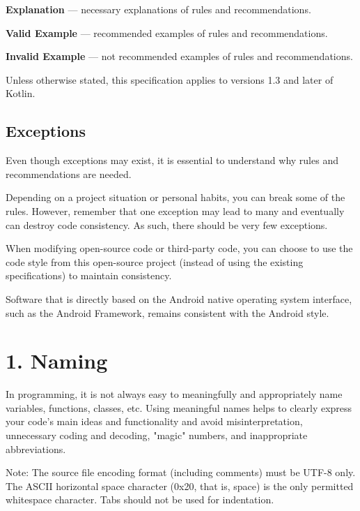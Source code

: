 \textbf{Explanation} — necessary explanations of rules and recommendations.



\textbf{Valid Example} — recommended examples of rules and recommendations.



\textbf{Invalid Example} — not recommended examples of rules and recommendations.



Unless otherwise stated, this specification applies to versions 1.3 and later of Kotlin.



\subsection*{\textbf{Exceptions}}



Even though exceptions may exist, it is essential to understand why rules and recommendations are needed.

Depending on a project situation or personal habits, you can break some of the rules. However, remember that one exception may lead to many and eventually can destroy code consistency. As such, there should be very few exceptions.

When modifying open-source code or third-party code, you can choose to use the code style from this open-source project (instead of using the existing specifications) to maintain consistency.

Software that is directly based on the Android native operating system interface, such as the Android Framework, remains consistent with the Android style.

\section*{\textbf{1. Naming}}

In programming, it is not always easy to meaningfully and appropriately name variables, functions, classes, etc. Using meaningful names helps to clearly express your code's main ideas and functionality and avoid misinterpretation, unnecessary coding and decoding, "magic" numbers, and inappropriate abbreviations.



Note: The source file encoding format (including comments) must be UTF-8 only. The ASCII horizontal space character (0x20, that is, space) is the only permitted whitespace character. Tabs should not be used for indentation.



